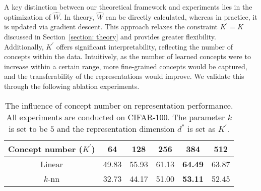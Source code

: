 A key distinction between our theoretical framework and experiments lies in the optimization of $\widehat{W}$. In theory, $\widehat{W}$ can be directly calculated, whereas in practice, it is updated via gradient descent. This approach relaxes the constraint $K^\prime = K$ discussed in Section~\ref{section: theory} and provides greater flexibility. Additionally, $K^\prime$ offers significant interpretability, reflecting the number of concepts within the data. Intuitively, as the number of learned concepts were to increase within a certain range, more fine-grained concepts would be captured, and the transferability of the representations would improve. We validate this through the following ablation experiments.


\begin{table}[ht]
    \centering
    \begin{tabular}{cccccc}
    \toprule
    Concept number ($K^\prime$) & 64 & 128 & 256 & 384 & 512 \\ 
    \midrule
    Linear & 49.83 & 55.93 & 61.13 & \textbf{64.49} & 63.87 \\
    $k$-nn & 32.73 & 44.17 & 51.00 & \textbf{53.11} & 52.45 \\
    \bottomrule
    \end{tabular}
    \caption{The influence of concept number on representation performance. All experiments are conducted on CIFAR-100. The parameter $k$ is set to be $5$ and the representation dimension $d^*$ is set as $K^\prime$.}
    \label{tab:ablation_study}
\end{table}
